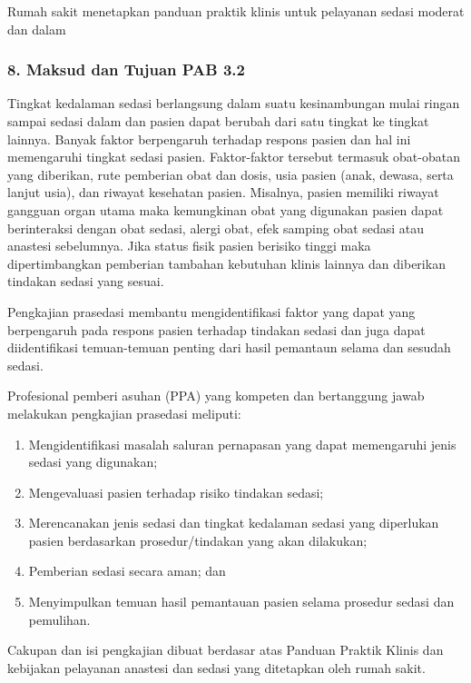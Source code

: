 \documentclass[
]{book}
\providecommand{\tightlist}{%
  \setlength{\itemsep}{0pt}\setlength{\parskip}{0pt}}
\begin{document}
Rumah sakit menetapkan panduan praktik klinis untuk pelayanan sedasi moderat dan dalam

\hypertarget{maksud-dan-tujuan-pab-3.2}{%
\subsubsection*{8. Maksud dan Tujuan PAB 3.2}\label{maksud-dan-tujuan-pab-3.2}}

Tingkat kedalaman sedasi berlangsung dalam suatu kesinambungan mulai ringan sampai sedasi dalam dan pasien dapat berubah dari satu tingkat ke tingkat lainnya. Banyak faktor berpengaruh terhadap respons pasien dan hal ini memengaruhi tingkat sedasi pasien. Faktor-faktor tersebut termasuk obat-obatan yang diberikan, rute pemberian obat dan dosis, usia pasien (anak, dewasa, serta lanjut usia), dan riwayat kesehatan pasien. Misalnya, pasien memiliki riwayat gangguan organ utama maka kemungkinan obat yang digunakan pasien dapat berinteraksi dengan obat sedasi, alergi obat, efek samping obat sedasi atau anastesi sebelumnya. Jika status fisik pasien berisiko tinggi maka dipertimbangkan pemberian tambahan kebutuhan klinis lainnya dan diberikan tindakan sedasi yang sesuai.

Pengkajian prasedasi membantu mengidentifikasi faktor yang dapat yang berpengaruh pada respons pasien terhadap tindakan sedasi dan juga dapat diidentifikasi temuan-temuan penting dari hasil pemantaun selama dan sesudah sedasi.

Profesional pemberi asuhan (PPA) yang kompeten dan bertanggung jawab melakukan pengkajian prasedasi meliputi:

\begin{enumerate}
\def\labelenumi{\alph{enumi}.}
\tightlist
\item
  Mengidentifikasi masalah saluran pernapasan yang dapat memengaruhi jenis sedasi yang digunakan;
\item
  Mengevaluasi pasien terhadap risiko tindakan sedasi;
\item
  Merencanakan jenis sedasi dan tingkat kedalaman sedasi yang diperlukan pasien berdasarkan prosedur/tindakan yang akan dilakukan;
\item
  Pemberian sedasi secara aman; dan
\item
  Menyimpulkan temuan hasil pemantauan pasien selama prosedur sedasi dan pemulihan.
\end{enumerate}

Cakupan dan isi pengkajian dibuat berdasar atas Panduan Praktik Klinis dan kebijakan pelayanan anastesi dan sedasi yang ditetapkan oleh rumah sakit.
\end{document}
